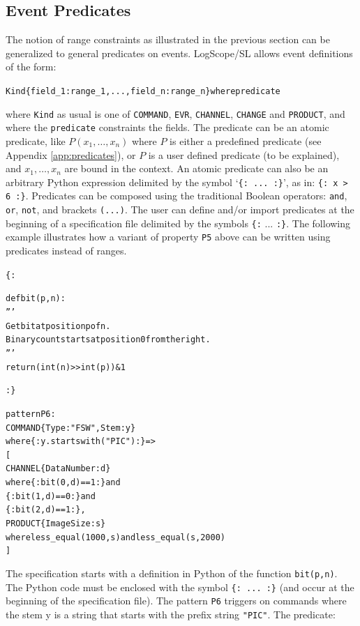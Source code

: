 \documentclass{report}
\newcommand{\python}{{\sc Python}}
\newcommand{\logscopeSL}{{\sc LogScope/SL}}
\newenvironment{code}[1] %
{
\vspace{0.5cm}
\begin{center}
\begin{Sbox}
\begin{minipage}{11cm}
\begin{alltt}
{\bf\em #1}
}
{
\end{alltt}
\end{minipage}
\end{Sbox}
\setlength{\fboxsep}{8pt}
\fbox{\TheSbox}
\end{center}
\vspace{0.5cm}
}
\begin{document}
\subsection{Event Predicates} 
 
The notion of range constraints as illustrated in the previous section can be generalized to general
predicates on events. \logscopeSL{}  allows event definitions of the form:

\begin{code}{}
  Kind\{field_1:range_1,...,field_n:range_n\} where predicate 
\end{code}
 
\noindent where {\tt Kind} as usual is one of {\tt COMMAND}, {\tt EVR}, {\tt CHANNEL}, {\tt CHANGE} and {\tt PRODUCT}, 
and where the {\tt predicate} constraints the fields. The predicate
can be an atomic predicate, like $P(x_1,\ldots,x_n)$ where $P$ is either a predefined
predicate (see Appendix \ref{app:predicates}), or $P$ is a user defined predicate (to be explained),
and $x_1,\ldots,x_n$ are bound in the context. An atomic predicate can
also be an arbitrary \python{} expression delimited by the symbol `{\tt \{: ... :\}}', as in: {\tt \{: x > 6 :\}}. 
Predicates can be composed using the traditional Boolean operators: {\tt and}, {\tt or}, {\tt not}, and brackets {\tt (...)}.
The user can define and/or import predicates at the beginning of a specification file delimited by the symbols {\tt \{:} ... {\tt :\}}.
The following example illustrates how a variant of property {\tt P5} above can be written using predicates instead of ranges.
 
\begin{code}{}
\{:

def bit(p,n):
    '''
    Get bit at position p of n. 
    Binary count starts at position 0 from the right.
    '''
    return (int(n) >> int(p)) & 1

:\}

pattern P6 :
  COMMAND\{Type: "FSW", Stem: y\} 
      where \{: y.startswith("PIC") :\} =>
  [
    CHANNEL\{DataNumber: d\} 
      where \{: bit(0,d)==1 :\} and 
            \{: bit(1,d)==0 :\} and 
            \{: bit(2,d)==1 :\},
    PRODUCT\{ImageSize : s\} 
      where less_equal(1000,s) and less_equal(s,2000)
  ]
\end{code} 
 
\noindent The specification starts with a definition in \python{} of the function {\tt bit(p,n)}. The \python{} code
must be enclosed with the symbol {\tt \{: ... :\}}  (and occur at the beginning of the specification file).
The pattern {\tt P6} triggers on commands where the stem y is a string that starts with the prefix string {\tt "PIC"}.
The predicate:
 
\end{document}
